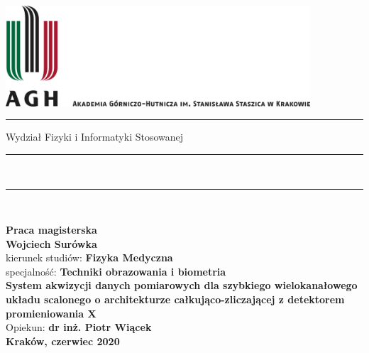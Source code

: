 \documentclass[a4paper,12pt]{article}
\author{Wojciech Surówka}
\begin{document}

\thispagestyle{empty}
\includegraphics[height=37.5mm]{agh_nzw_a_pl_1w_wbr}\\
\rule{30mm}{0pt}
{\large \textsf{Wydział Fizyki i Informatyki Stosowanej}}\\
\rule{\textwidth}{3pt}\\
\rule[2ex]
{\textwidth}{1pt}\\
\vspace{7ex}
\begin{center}
{\LARGE \bf \textsf{Praca magisterska}}\\
\vspace{13ex}
{\bf \Large \textsf{Wojciech Surówka}}\\
\vspace{3ex}
{\sf\small kierunek studiów:} {\bf\small \textsf{Fizyka Medyczna}}\\
\vspace{1.5ex}
{\sf\small specjalność:} {\bf\small \textsf{Techniki obrazowania i biometria}}\\
\vspace{10ex}
{\bf \huge \textsf{System akwizycji danych pomiarowych dla szybkiego wielokanałowego układu scalonego o architekturze całkująco-zliczającej z detektorem promieniowania X}}\\
\vspace{14ex}
{\Large Opiekun: \bf \textsf{dr inż. Piotr Wiącek}}\\
\vspace{16ex}
{\large \bf \textsf{Kraków, czerwiec 2020}}
\end{center}

\newpage
\end{document}
